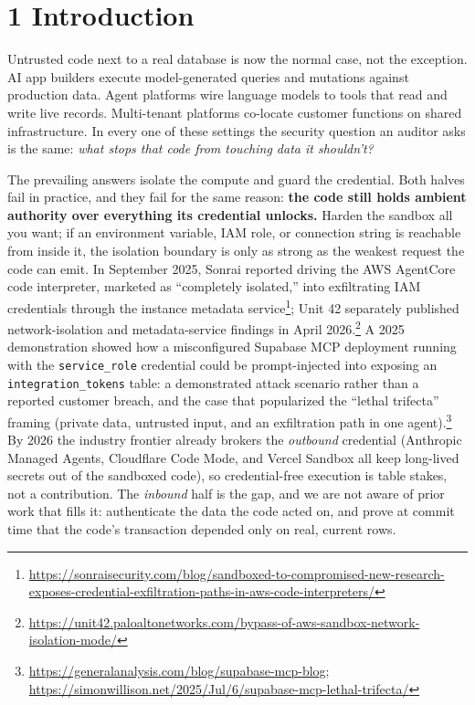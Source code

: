 \documentclass[
  11pt,
]{article}
\begin{document}
\section{1 Introduction}\label{introduction}

Untrusted code next to a real database is now the normal case, not the exception. AI app builders execute model-generated queries and mutations against production data. Agent platforms wire language models to tools that read and write live records. Multi-tenant platforms co-locate customer functions on shared infrastructure. In every one of these settings the security question an auditor asks is the same: \emph{what stops that code from touching data it shouldn't?}

The prevailing answers isolate the compute and guard the credential. Both halves fail in practice, and they fail for the same reason: \textbf{the code still holds ambient authority over everything its credential unlocks.} Harden the sandbox all you want; if an environment variable, IAM role, or connection string is reachable from inside it, the isolation boundary is only as strong as the weakest request the code can emit. In September 2025, Sonrai reported driving the AWS AgentCore code interpreter, marketed as ``completely isolated,'' into exfiltrating IAM credentials through the instance metadata service\footnote{\url{https://sonraisecurity.com/blog/sandboxed-to-compromised-new-research-exposes-credential-exfiltration-paths-in-aws-code-interpreters/}}; Unit 42 separately published network-isolation and metadata-service findings in April 2026.\footnote{\url{https://unit42.paloaltonetworks.com/bypass-of-aws-sandbox-network-isolation-mode/}} A 2025 demonstration showed how a misconfigured Supabase MCP deployment running with the \texttt{service\_role} credential could be prompt-injected into exposing an \texttt{integration\_tokens} table: a demonstrated attack scenario rather than a reported customer breach, and the case that popularized the ``lethal trifecta'' framing (private data, untrusted input, and an exfiltration path in one agent).\footnote{\url{https://generalanalysis.com/blog/supabase-mcp-blog}; \url{https://simonwillison.net/2025/Jul/6/supabase-mcp-lethal-trifecta/}} By 2026 the industry frontier already brokers the \emph{outbound} credential (Anthropic Managed Agents, Cloudflare Code Mode, and Vercel Sandbox all keep long-lived secrets out of the sandboxed code), so credential-free execution is table stakes, not a contribution. The \emph{inbound} half is the gap, and we are not aware of prior work that fills it: authenticate the data the code acted on, and prove at commit time that the code's transaction depended only on real, current rows.
\end{document}
